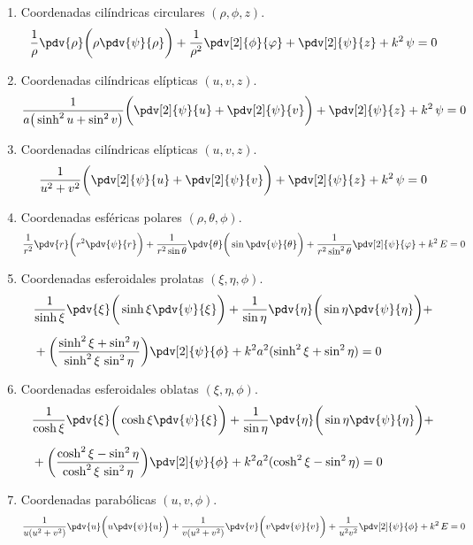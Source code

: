 \begin{enumerate}
\item Coordenadas cilíndricas circulares $(\rho, \phi, z)$.
\begin{align*}
\dfrac{1}{\rho} \pdv{\rho} \bigg( \rho \pdv{\psi}{\rho} \bigg) + \dfrac{1}{\rho^{2}} \pdv[2]{\phi}{\varphi} + \pdv[2]{\psi}{z} + k^{2} \, \psi = 0
\end{align*}
\item Coordenadas cilíndricas elípticas $(u, v, z)$.
\begin{align*}
\dfrac{1}{a \big( \sinh^{2} u + \sin^{2} v \big)} \bigg( \pdv[2]{\psi}{u} + \pdv[2]{\psi}{v} \bigg) + \pdv[2]{\psi}{z} + k^{2} \, \psi = 0
\end{align*}
\item Coordenadas cilíndricas elípticas $(u, v, z)$.
\begin{align*}
\dfrac{1}{u^{2} + v^{2}} \bigg( \pdv[2]{\psi}{u} + \pdv[2]{\psi}{v} \bigg) + \pdv[2]{\psi}{z} + k^{2} \, \psi = 0
\end{align*}
\item Coordenadas esféricas polares $(\rho, \theta, \phi)$.
\begin{align*}
\dfrac{1}{r^{2}} \pdv{r} \bigg( r^{2} \pdv{\psi}{r} \bigg) + \dfrac{1}{r^{2} \sin \theta} \pdv{\theta} \bigg( \sin \pdv{\psi}{\theta} \bigg) + \dfrac{1}{r^{2} \sin^{2} \theta} \pdv[2]{\psi}{\varphi} + k^{2} \, E = 0
\end{align*}
\item Coordenadas esferoidales prolatas $(\xi, \eta, \phi)$.
\begin{align*}
&\dfrac{1}{\sinh \xi} \pdv{\xi} \bigg( \sinh \xi \pdv{\psi}{\xi} \bigg) + \dfrac{1}{\sin \eta} \pdv{\eta} \bigg( \sin \eta \pdv{\psi}{\eta} \bigg) + \\[0.5em]
&+ \bigg( \dfrac{\sinh^{2} \xi + \sin^{2} \eta}{\sinh^{2} \xi \, \sin^{2} \eta} \bigg) \pdv[2]{\psi}{\phi} + k^{2} a^{2} (\sinh^{2} \xi + \sin^{2} \eta) = 0
\end{align*}
\item Coordenadas esferoidales oblatas $(\xi, \eta, \phi)$.
\begin{align*}
&\dfrac{1}{\cosh \xi} \pdv{\xi} \bigg( \cosh \xi \pdv{\psi}{\xi} \bigg) + \dfrac{1}{\sin \eta} \pdv{\eta} \bigg( \sin \eta \pdv{\psi}{\eta} \bigg) + \\[0.5em]
&+ \bigg( \dfrac{\cosh^{2} \xi - \sin^{2} \eta}{\cosh^{2} \xi \, \sin^{2} \eta} \bigg) \pdv[2]{\psi}{\phi} + k^{2} a^{2} (\cosh^{2} \xi - \sin^{2} \eta) = 0
\end{align*}
\item Coordenadas parabólicas $(u, v, \phi)$.
\begin{align*}
\dfrac{1}{u (u^{2} + v^{2})} \pdv{u} \bigg( u \pdv{\psi}{u} \bigg) + \dfrac{1}{v (u^{2} + v^{2})} \pdv{v} \bigg( v  \pdv{\psi}{v} \bigg) + \dfrac{1}{u^{2} v^{2}} \pdv[2]{\psi}{\phi} +k^{2} \, E = 0
\end{align*}
\end{enumerate}